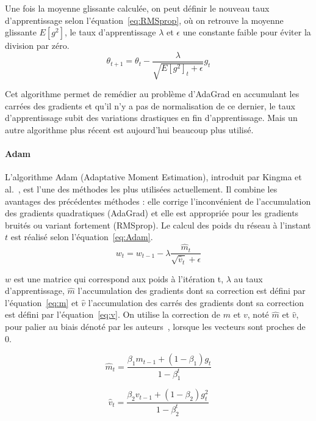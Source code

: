 Une fois la moyenne glissante calculée, on peut définir le nouveau taux d'apprentissage selon l'équation~\ref{eq:RMSprop}, où on retrouve la moyenne glissante $E[g^{2}]$, le taux d'apprentissage $\lambda$ et $\epsilon$ une constante faible pour éviter la division par zéro.
\begin{equation}
  \theta_{t+1} = \theta_{t} - \frac{\lambda}{\sqrt{E\left[g^{2}\right]_{t} + \epsilon}}g_{t}
  \label{eq:RMSprop}
\end{equation}

Cet algorithme permet de remédier au problème d'AdaGrad en accumulant les carrées des gradients et qu'il n'y a pas de normalisation de ce dernier, le taux d'apprentissage subit des variations drastiques en fin d'apprentissage. Mais un autre algorithme plus récent est aujourd'hui beaucoup plus utilisé.

\paragraph{Adam}
L'algorithme Adam (Adaptative Moment Estimation), introduit par Kingma et al.~\cite{Kingma2015}, est l'une des méthodes les plus utilisées actuellement. Il combine les avantages des précédentes méthodes : elle corrige l'inconvénient de l'accumulation des gradients quadratiques (AdaGrad) et elle est appropriée pour les gradients bruités ou variant fortement (RMSprop). Le calcul des poids du réseau à l'instant $t$ est réalisé selon l'équation~\ref{eq:Adam}.
\begin{equation}
  w_{t} = w_{t-1} - \lambda\frac{\hat{m}_{t}}{\sqrt{\hat{v}_{t}} + \epsilon}
  \label{eq:Adam}
\end{equation}

$w$ est une matrice qui correspond aux poids à l'itération t, $\lambda$ au taux d'apprentissage, $\hat{m}$ l'accumulation des gradients dont sa correction est défini par l'équation~\ref{eq:m} et $\hat{v}$ l'accumulation des carrés des gradients dont sa correction est défini par l'équation~\ref{eq:v}. On utilise la correction de $m$ et $v$, noté $\hat{m}$ et $\hat{v}$, pour palier au biais dénoté par les auteurs~\cite{Kingma2015}, lorsque les vecteurs sont proches de $0$.

\begin{equation}
  \hat{m}_{t} = \frac{\beta_{1}m_{t-1} + (1-\beta_{1})g_{t}}{1-\beta^{t}_{1}}
  \label{eq:m}
\end{equation}

\begin{equation}
  \hat{v}_{t} = \frac{\beta_{2}v_{t-1} + (1-\beta_{2})g_{t}^{2}}{1-\beta^{t}_{2}}
  \label{eq:v}
\end{equation}

